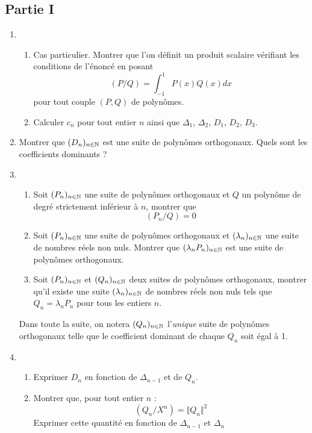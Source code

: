 \subsection*{Partie I}
\begin{enumerate}
 \item 
  \begin{enumerate}
    \item Cas particulier. Montrer que l'on définit un produit scalaire vérifiant les conditions de l'énoncé en posant
\begin{displaymath}
 (P/Q)=\int_{-1}^{1}P(x)Q(x)dx
\end{displaymath}
pour tout couple $(P,Q)$ de polynômes.
    \item Calculer $c_n$ pour tout entier $n$ ainsi que $\Delta_1$, $\Delta_2$, $D_1$, $D_2$, $D_3$.
\end{enumerate}
 
\item Montrer que $(D_n)_{n\in \mathbb{N}}$ est une suite de polynômes orthogonaux. Quels sont les coefficients dominants ?

\item \begin{enumerate}
 \item Soit $(P_n)_{n\in \mathbb{N}}$ une suite de polynômes orthogonaux et $Q$ un polynôme de degré strictement inférieur à $n$, montrer que
 \begin{displaymath}
   (P_n / Q)=0
 \end{displaymath}
 \item Soit $(P_n)_{n\in \mathbb{N}}$ une suite de polynômes orthogonaux et $(\lambda_n)_{n\in \mathbb{N}}$ une suite de nombres réels non nuls. Montrer que $(\lambda_n P_n)_{n\in \mathbb{N}}$ est une suite de polynômes orthogonaux.
 \item Soit $(P_n)_{n\in \mathbb{N}}$ et $(Q_n)_{n\in \mathbb{N}}$ deux suites de polynômes orthogonaux, montrer qu'il existe une suite $(\lambda_n)_{n\in \mathbb{N}}$ de nombres réels non nuls tels que $Q_n=\lambda_n P_n$ pour tous les entiers $n$.
\end{enumerate}

Dans toute la suite, on notera $(Q_n)_{n\in \mathbb{N}}$ l'\emph{unique} suite de polynômes orthogonaux telle que le coefficient dominant de chaque $Q_n$ soit égal à 1.

\item \begin{enumerate}
 \item Exprimer $D_n$ en fonction de $\Delta_{n-1}$ et de $Q_n$.
 \item Montrer que, pour tout entier $n$ :
\begin{displaymath}
 (Q_n / X^n) = \Vert Q_n \Vert ^2
\end{displaymath}
Exprimer cette quantité en fonction de $\Delta_{n-1}$ et $\Delta_n$
\end{enumerate}


\end{enumerate}

